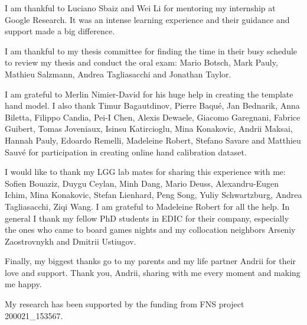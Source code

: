 I am thankful to Luciano Sbaiz and Wei Li for mentoring my internship at Google Research. It was an intense learning experience and their guidance and support made a big difference.

I am thankful to my thesis committee for finding the time in their busy schedule to review my thesis and conduct the oral exam: Mario Botsch, Mark Pauly, Mathieu Salzmann, Andrea Tagliasacchi and Jonathan Taylor.

I am grateful to Merlin Nimier-David for his huge help in creating the template hand model. I also thank Timur Bagautdinov, Pierre Baqué, Jan Bednarik, Anna Biletta, Filippo Candia, Pei-I Chen, Alexis Dewaele, Giacomo Garegnani, Fabrice Guibert, Tomas Joveniaux, Isinsu Katircioglu, Mina Konakovic, Andrii Maksai, Hannah Pauly, Edoardo Remelli, Madeleine Robert, Stefano Savare and Matthieu Sauvé for participation in creating online hand calibration dataset.

I would like to thank my LGG lab mates for sharing this experience with me: Sofien Bouaziz, Duygu Ceylan, Minh Dang, Mario Deuss, Alexandru-Eugen Ichim, Mina Konakovic, Stefan Lienhard, Peng Song, Yuliy Schwartzburg, Andrea Tagliasacchi, Ziqi Wang. I am grateful to Madeleine Robert for all the help. In general I thank my fellow PhD students in EDIC for their company, especially the ones who came to board games nights and my collocation neighbors Arseniy Zaostrovnykh and Dmitrii Ustiugov.

Finally, my biggest thanks go to my parents and my life partner Andrii for their love and support. Thank you, Andrii, sharing with me every moment and making me happy.

My research has been supported by the funding from FNS project 200021\_153567.

 
